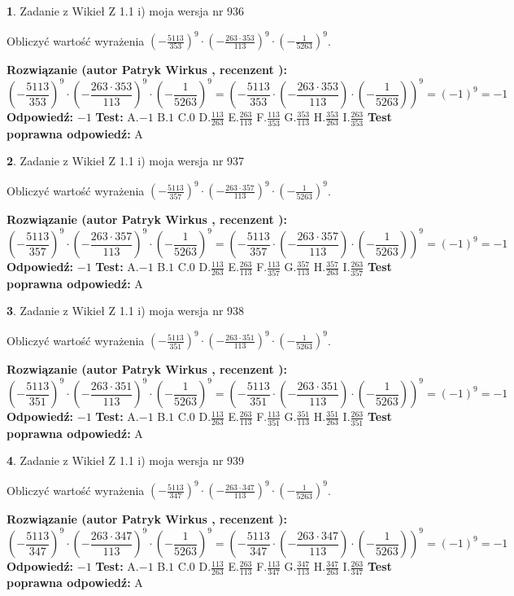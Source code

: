 \documentclass[12pt, a4paper]{article}
\theoremstyle{definition} %
\newtheorem{zad}{}
\newcommand{\zadStart}[1]{\begin{zad}#1\newline}
\newcommand{\zadStop}{\end{zad}}
\newcommand{\rozwStart}[2]{\noindent \textbf{Rozwiązanie (autor #1 , recenzent #2): }\newline}
\newcommand{\rozwStop}{\newline}
\newcommand{\odpStart}{\noindent \textbf{Odpowiedź:}\newline}
\newcommand{\odpStop}{\newline}
\newcommand{\testStart}{\noindent \textbf{Test:}\newline}
\newcommand{\testStop}{\newline}
\newcommand{\kluczStart}{\noindent \textbf{Test poprawna odpowiedź:}\newline}
\newcommand{\kluczStop}{\newline}
\begin{document}
\zadStart{Zadanie z Wikieł Z 1.1 i) moja wersja nr 936}

Obliczyć wartość wyrażenia $(-\frac{5113}{353})^{9} \cdot (-\frac{263 \cdot 353}{113})^{9} \cdot (-\frac{1}{5263})^{9}$.
\zadStop
\rozwStart{Patryk Wirkus}{}
$$(-\frac{5113}{353})^{9} \cdot (-\frac{263 \cdot 353}{113})^{9} \cdot (-\frac{1}{5263})^{9} = (-\frac{5113}{353} \cdot (-\frac{263 \cdot 353}{113}) \cdot (-\frac{1}{5263}))^{9} = (-1)^{9} = -1$$
\rozwStop
\odpStart
$-1$
\odpStop
\testStart
A.$-1$ B.$1$ C.$0$ D.$\frac{113}{263}$ E.$\frac{263}{113}$
F.$\frac{113}{353}$ G.$\frac{353}{113}$
H.$\frac{353}{263}$
I.$\frac{263}{353}$
\testStop
\kluczStart
A
\kluczStop



\zadStart{Zadanie z Wikieł Z 1.1 i) moja wersja nr 937}

Obliczyć wartość wyrażenia $(-\frac{5113}{357})^{9} \cdot (-\frac{263 \cdot 357}{113})^{9} \cdot (-\frac{1}{5263})^{9}$.
\zadStop
\rozwStart{Patryk Wirkus}{}
$$(-\frac{5113}{357})^{9} \cdot (-\frac{263 \cdot 357}{113})^{9} \cdot (-\frac{1}{5263})^{9} = (-\frac{5113}{357} \cdot (-\frac{263 \cdot 357}{113}) \cdot (-\frac{1}{5263}))^{9} = (-1)^{9} = -1$$
\rozwStop
\odpStart
$-1$
\odpStop
\testStart
A.$-1$ B.$1$ C.$0$ D.$\frac{113}{263}$ E.$\frac{263}{113}$
F.$\frac{113}{357}$ G.$\frac{357}{113}$
H.$\frac{357}{263}$
I.$\frac{263}{357}$
\testStop
\kluczStart
A
\kluczStop



\zadStart{Zadanie z Wikieł Z 1.1 i) moja wersja nr 938}

Obliczyć wartość wyrażenia $(-\frac{5113}{351})^{9} \cdot (-\frac{263 \cdot 351}{113})^{9} \cdot (-\frac{1}{5263})^{9}$.
\zadStop
\rozwStart{Patryk Wirkus}{}
$$(-\frac{5113}{351})^{9} \cdot (-\frac{263 \cdot 351}{113})^{9} \cdot (-\frac{1}{5263})^{9} = (-\frac{5113}{351} \cdot (-\frac{263 \cdot 351}{113}) \cdot (-\frac{1}{5263}))^{9} = (-1)^{9} = -1$$
\rozwStop
\odpStart
$-1$
\odpStop
\testStart
A.$-1$ B.$1$ C.$0$ D.$\frac{113}{263}$ E.$\frac{263}{113}$
F.$\frac{113}{351}$ G.$\frac{351}{113}$
H.$\frac{351}{263}$
I.$\frac{263}{351}$
\testStop
\kluczStart
A
\kluczStop



\zadStart{Zadanie z Wikieł Z 1.1 i) moja wersja nr 939}

Obliczyć wartość wyrażenia $(-\frac{5113}{347})^{9} \cdot (-\frac{263 \cdot 347}{113})^{9} \cdot (-\frac{1}{5263})^{9}$.
\zadStop
\rozwStart{Patryk Wirkus}{}
$$(-\frac{5113}{347})^{9} \cdot (-\frac{263 \cdot 347}{113})^{9} \cdot (-\frac{1}{5263})^{9} = (-\frac{5113}{347} \cdot (-\frac{263 \cdot 347}{113}) \cdot (-\frac{1}{5263}))^{9} = (-1)^{9} = -1$$
\rozwStop
\odpStart
$-1$
\odpStop
\testStart
A.$-1$ B.$1$ C.$0$ D.$\frac{113}{263}$ E.$\frac{263}{113}$
F.$\frac{113}{347}$ G.$\frac{347}{113}$
H.$\frac{347}{263}$
I.$\frac{263}{347}$
\testStop
\kluczStart
A
\kluczStop
\end{document}

